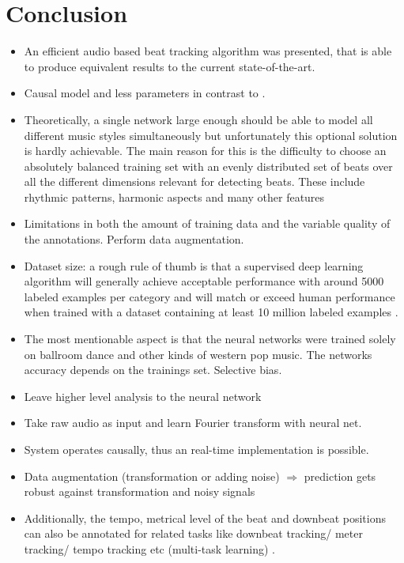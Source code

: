 \documentclass{scrartcl}
\begin{document}
\newpage 

\section{Conclusion}

\begin{itemize}
\item An efficient audio based beat tracking algorithm was presented, that is able to produce equivalent results to the current state-of-the-art. 
\item Causal model and less parameters in contrast to \cite{Boeck2014}.
\item Theoretically, a single network large enough should be able to model all different music styles simultaneously but unfortunately this optional solution is hardly achievable. The main reason for this is the difficulty to choose an absolutely balanced training set with an evenly distributed set of beats over all the different dimensions relevant for detecting beats. These include rhythmic patterns, harmonic aspects and many other features
\item Limitations in both the amount of training data and the variable quality of the annotations. Perform data augmentation. 
\item Dataset size: a rough rule of thumb is that a supervised deep learning algorithm will generally achieve acceptable performance with around 5000 labeled examples per category and will match or exceed human performance when trained with a dataset containing at least 10 million labeled examples \cite{Goodfellow2016}.
\item The most mentionable aspect is that the neural networks were trained solely on ballroom dance and other kinds of western pop music. The networks accuracy depends on the trainings set. Selective bias. 
\item Leave higher level analysis to the neural network
\item Take raw audio as input and learn Fourier transform with neural net.
\item System operates causally, thus an real-time implementation is possible.
\item Data augmentation (transformation or adding noise) $\Rightarrow$ prediction gets robust against transformation and noisy signals
\item Additionally, the tempo, metrical level of the beat and downbeat positions can also be annotated for related tasks like downbeat tracking/ meter tracking/ tempo tracking etc (multi-task learning) \cite{Boeck2019}.
\end{itemize}
\end{document}
